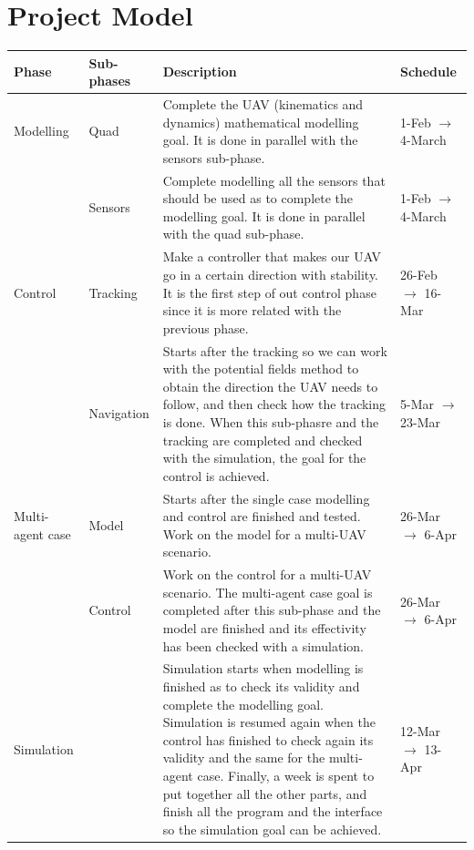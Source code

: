 \documentclass{article}
\begin{document}
	\section{Project Model}
				\begin{center}
			\begin{tabular}{|C{2cm}|C{2cm}|C{7cm}|C{3cm}|} \hline
				Phase & Sub-phases & Description & Schedule\\ \hline
				Modelling & Quad & Complete the UAV (kinematics and dynamics) mathematical modelling goal. It is done in parallel with the sensors sub-phase. &  1-Feb $\rightarrow$ 4-March  \\ 
				& Sensors & Complete modelling all the sensors that should be used as to complete the modelling goal. It is done in parallel with the quad sub-phase. & 1-Feb $\rightarrow$ 4-March \\ \hline
				
				Control & Tracking & Make a controller that makes our UAV go in a certain direction with stability. It is the first step of out control phase since it is more related with the previous phase. &  26-Feb $\rightarrow$ 16-Mar\\ 
				&Navigation & Starts after the tracking so we can work with the potential fields method to obtain the direction the UAV needs to follow, and then check how the tracking is done. When this sub-phasre and the tracking are completed and checked with the simulation, the goal for the control is achieved. & 5-Mar $\rightarrow$ 23-Mar \\ \hline
				
				Multi-agent case & Model & Starts after the single case modelling and control are finished and tested. Work on the model for a multi-UAV scenario. & 26-Mar $\rightarrow$ 6-Apr\\ 
				&Control & Work on the control for a multi-UAV scenario. The multi-agent case goal is completed after this sub-phase and the model are finished and its effectivity has been checked with a simulation. & 26-Mar $\rightarrow$ 6-Apr \\ \hline
				
				Simulation & & Simulation starts when modelling is finished as to check its validity and complete the modelling goal. Simulation is resumed again when the control has finished to check again its validity and the same for the multi-agent case. Finally, a week is spent to put together all the other parts, and finish all the program and the interface so the simulation goal can be achieved. & 12-Mar $\rightarrow$ 13-Apr \\ \hline
				

\end{tabular}
\end{center}
\end{document}

